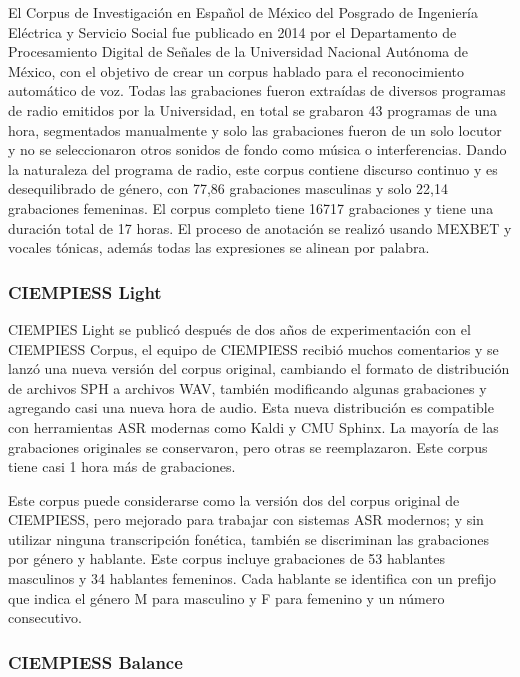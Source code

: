 El Corpus de Investigación en Español de México del Posgrado de Ingeniería Eléctrica y Servicio Social fue publicado en 2014 por el Departamento de Procesamiento Digital de Señales de la Universidad Nacional Autónoma de México, con el objetivo de crear un corpus hablado para el reconocimiento automático de voz. Todas las grabaciones fueron extraídas de diversos programas de radio emitidos por la Universidad, en total se grabaron 43 programas de una hora, segmentados manualmente y solo las grabaciones fueron de un solo locutor y no se seleccionaron otros sonidos de fondo como música o interferencias. Dando la naturaleza del programa de radio, este corpus contiene discurso continuo y es desequilibrado de género, con 77,86 grabaciones masculinas y solo 22,14 grabaciones femeninas. El corpus completo tiene 16717 grabaciones y tiene una duración total de 17 horas. El proceso de anotación se realizó usando MEXBET y vocales tónicas, además todas las expresiones se alinean por palabra.

\subsubsection{CIEMPIESS Light}

CIEMPIES Light se publicó después de dos años de experimentación con el CIEMPIESS Corpus, el equipo de CIEMPIESS recibió muchos comentarios y se lanzó una nueva versión del corpus original, cambiando el formato de distribución de archivos SPH a archivos WAV, también modificando algunas grabaciones y agregando casi una nueva hora de audio. Esta nueva distribución es compatible con herramientas ASR modernas como Kaldi y CMU Sphinx. La mayoría de las grabaciones originales se conservaron, pero otras se reemplazaron. Este corpus tiene casi 1 hora más de grabaciones.

Este corpus puede considerarse como la versión dos del corpus original de CIEMPIESS, pero mejorado para trabajar con sistemas ASR modernos; y sin utilizar ninguna transcripción fonética, también se discriminan las grabaciones por género y hablante. Este corpus incluye grabaciones de 53 hablantes masculinos y 34 hablantes femeninos. Cada hablante se identifica con un prefijo que indica el género M para masculino y F para femenino y un número consecutivo.

\subsubsection{CIEMPIESS Balance}

